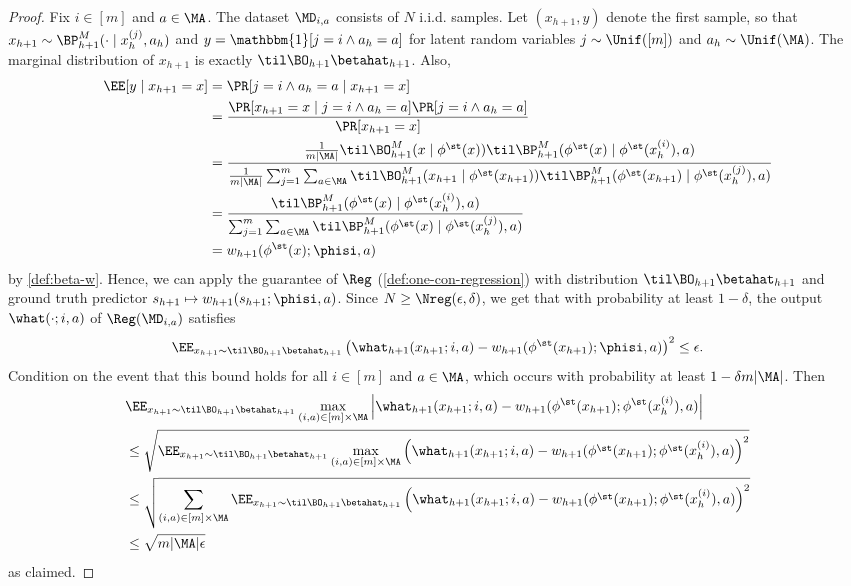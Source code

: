 \begin{proof}
Fix $i \in [m]$ and $a \in \MA$. The dataset $\MD_{i,a}$ consists of $N$ i.i.d. samples. Let $(x_{h+1},y)$ denote the first sample, so that $x_{h+1} \sim \BP^M_{h+1}(\cdot\mid{}x^{(j)}_h,a_h)$ and $y = \mathbbm{1}[j=i \land a_h=a]$ for latent random variables $j \sim \Unif([m])$ and $a_h \sim \Unif(\MA)$. The marginal distribution of $x_{h+1}$ is exactly $\til\BO_{h+1}\betahat_{h+1}$. Also,
\begin{align*}
\EE[y\mid{}x_{h+1}=x]
&= \Pr[j=i \land a_h=a\mid{}x_{h+1}=x] \\ 
&= \frac{\Pr[x_{h+1}=x\mid{}j=i\land a_h=a]\Pr[j=i \land a_h=a]}{\Pr[x_{h+1}=x]} \\ 
&= \frac{\frac{1}{m|\MA|} \til \BO^M_{h+1}(x\mid{}\phi^\st(x)) \til\BP^M_{h+1}(\phi^\st(x)\mid{}\phi^\st(x_h^{(i)}), a)}{\frac{1}{m|\MA|} \sum_{j=1}^m \sum_{a \in \MA} \til \BO^M_{h+1}(x_{h+1}\mid{}\phi^\st(x_{h+1})) \til\BP^M_{h+1}(\phi^\st(x_{h+1})\mid{}\phi^\st(x_h^{(j)}), a)} \\ 
&= \frac{\til\BP^M_{h+1}(\phi^\st(x)\mid{}\phi^\st(x_h^{(i)}), a)}{ \sum_{j=1}^m \sum_{a \in \MA} \til\BP^M_{h+1}(\phi^\st(x)\mid{}\phi^\st(x_h^{(j)}), a)} \\ 
&= w_{h+1}(\phi^\st(x);\phisi,a)
\end{align*}
by \cref{def:beta-w}. Hence, we can apply the guarantee of $\Reg$ (\cref{def:one-con-regression}) with distribution $\til\BO_{h+1}\betahat_{h+1}$ and ground truth predictor $s_{h+1} \mapsto w_{h+1}(s_{h+1};\phisi,a)$. Since $N \geq \Nreg(\epsilon,\delta)$, we get that with probability at least $1-\delta$, the output $\what(\cdot;i,a)$ of $\Reg(\MD_{i,a})$ satisfies
\[\EE_{x_{h+1}\sim\til\BO_{h+1}\betahat_{h+1}} \left(\what_{h+1}(x_{h+1};i,a) - w_{h+1}(\phi^\st(x_{h+1});\phisi,a)\right)^2 \leq \epsilon.\]
Condition on the event that this bound holds for all $i \in [m]$ and $a \in \MA$, which occurs with probability at least $1-\delta m |\MA|$. Then
\begin{align*}
&\EE_{x_{h+1} \sim \til\BO_{h+1} \betahat_{h+1}} \max_{(i,a) \in [m]\times\MA} \left|\what_{h+1}(x_{h+1};i,a) - w_{h+1}(\phi^\st(x_{h+1});\phi^\st(x_h^{(i)}),a) \right|\\
&\leq \sqrt{\EE_{x_{h+1} \sim \til\BO_{h+1} \betahat_{h+1}} \max_{(i,a) \in [m]\times\MA} \left(\what_{h+1}(x_{h+1};i,a) - w_{h+1}(\phi^\st(x_{h+1});\phi^\st(x_h^{(i)}),a) \right)^2} \\ 
&\leq \sqrt{\sum_{(i,a) \in [m]\times\MA}\EE_{x_{h+1} \sim \til\BO_{h+1} \betahat_{h+1}} \left(\what_{h+1}(x_{h+1};i,a) - w_{h+1}(\phi^\st(x_{h+1});\phi^\st(x_h^{(i)}),a) \right)^2} \\ 
&\leq \sqrt{m|\MA|\epsilon}
\end{align*}
as claimed.
\end{proof}





